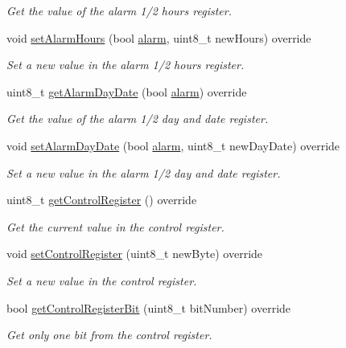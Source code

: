 \begin{DoxyCompactItemize}
\begin{DoxyCompactList}\small\item\em Get the value of the alarm 1/2 hours register. \end{DoxyCompactList}\item 
void \mbox{\hyperlink{class_d_s3231_a0bcc7e2285869ffbe29d19c593f5a447}{set\+Alarm\+Hours}} (bool \mbox{\hyperlink{classalarm}{alarm}}, uint8\+\_\+t new\+Hours) override
\begin{DoxyCompactList}\small\item\em Set a new value in the alarm 1/2 hours register. \end{DoxyCompactList}\item 
uint8\+\_\+t \mbox{\hyperlink{class_d_s3231_a0b013c68f96b5145c1c9feb9270855a7}{get\+Alarm\+Day\+Date}} (bool \mbox{\hyperlink{classalarm}{alarm}}) override
\begin{DoxyCompactList}\small\item\em Get the value of the alarm 1/2 day and date register. \end{DoxyCompactList}\item 
void \mbox{\hyperlink{class_d_s3231_aa2048cc766ca58f707e84cbc564c1276}{set\+Alarm\+Day\+Date}} (bool \mbox{\hyperlink{classalarm}{alarm}}, uint8\+\_\+t new\+Day\+Date) override
\begin{DoxyCompactList}\small\item\em Set a new value in the alarm 1/2 day and date register. \end{DoxyCompactList}\item 
uint8\+\_\+t \mbox{\hyperlink{class_d_s3231_a2e023e091c63208290e275874552a716}{get\+Control\+Register}} () override
\begin{DoxyCompactList}\small\item\em Get the current value in the control register. \end{DoxyCompactList}\item 
void \mbox{\hyperlink{class_d_s3231_a1151a22a8dd47470b22562cedae114e9}{set\+Control\+Register}} (uint8\+\_\+t new\+Byte) override
\begin{DoxyCompactList}\small\item\em Set a new value in the control register. \end{DoxyCompactList}\item 
bool \mbox{\hyperlink{class_d_s3231_a5b22edafc0d475fd6e33936c286654d5}{get\+Control\+Register\+Bit}} (uint8\+\_\+t bit\+Number) override
\begin{DoxyCompactList}\small\item\em Get only one bit from the control register. \end{DoxyCompactList}\item 

\end{DoxyCompactItemize}
